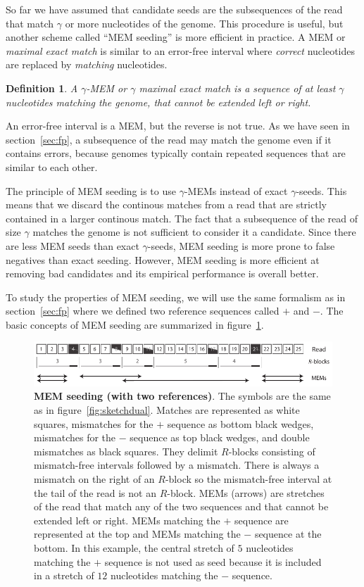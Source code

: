 \documentclass{article}
\newtheorem{definition}{Definition}
\begin{document}
So far we have assumed that candidate seeds are the subsequences of the
read that match $\gamma$ or more nucleotides of the genome. This procedure
is useful, but another scheme called ``MEM seeding'' is more efficient in
practice. A MEM or \textit{maximal exact match} is similar to an
error-free interval where \emph{correct} nucleotides are replaced by
\emph{matching} nucleotides.

\begin{definition}
A $\gamma$-MEM or $\gamma$ \textit{maximal exact match} is a sequence of
at least $\gamma$ nucleotides matching the genome, that cannot be extended
left or right.
\end{definition}

An error-free interval is a MEM, but the reverse is not true. As we have
seen in section~\ref{sec:fp}, a subsequence of the read may match the
genome even if it contains errors, because genomes typically contain
repeated sequences that are similar to each other.

The principle of MEM seeding is to use $\gamma$-MEMs instead of exact
$\gamma$-seeds. This means that we discard the continous matches from a
read that are strictly contained in a larger continous match. The fact
that a subsequence of the read of size $\gamma$ matches the genome is not
sufficient to consider it a candidate. Since there are less MEM seeds than
exact $\gamma$-seeds, MEM seeding is more prone to false negatives than
exact seeding. However, MEM seeding is more efficient at removing bad
candidates and its empirical performance is overall better.

To study the properties of MEM seeding, we will use the same formalism as
in section~\ref{sec:fp} where we defined two reference sequences called
$+$ and $-$. The basic concepts of MEM seeding are summarized in
figure~\ref{fig:sketchmem}.

\begin{figure}[h]
\centering
\includegraphics[scale=0.88]{sketch_MEM.pdf}
\caption{\textbf{MEM seeding (with two references)}. The symbols are the
same as in figure~\ref{fig:sketchdual}. Matches are represented as white
squares, mismatches for the $+$ sequence as bottom black wedges,
mismatches for the $-$ sequence as top black wedges, and double mismatches
as black squares. They delimit $R$-blocks consisting of mismatch-free
intervals followed by a mismatch. There is always a mismatch on the right
of an $R$-block so the mismatch-free interval at the tail of the read is
not an $R$-block. MEMs (arrows) are stretches of the read that match any
of the two sequences and that cannot be extended left or right. MEMs
matching the $+$ sequence are represented at the top and MEMs matching the
$-$ sequence at the bottom. In this example, the central stretch of $5$
nucleotides matching the $+$ sequence is not used as seed because it is
included in a stretch of $12$ nucleotides matching the $-$ sequence.}
\label{fig:sketchmem}
\end{figure}
\end{document}
